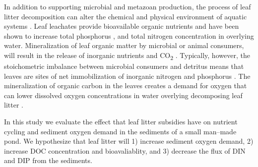In addition to supporting microbial and metazoan production, the process of leaf litter decomposition can alter the chemical and physical environment of aquatic systems \cite{Gessner_1999}. Leaf leachates provide bioavailable organic nutrients \cite{McConnell_1968,Duan_2014} and have been shown to increase total phosphorus \cite{Feh_2015b}, and total nitrogen \cite{Feh_2015} concentration in overlying water. Mineralization of leaf organic matter by microbial or animal consumers, will result in the release of inorganic nutrients and CO\textsubscript{2} \cite{CITE}. Typically, however, the stoichometric imbalance between microbial consumers and detritus means that leaves are sites of net immobilization of inorganic nitrogen and phosphorus \cite{CITE}. The mineralization of organic carbon in the leaves creates a demand for oxygen \cite{CITE} that can lower dissolved oxygen concentrations in water overlying decomposing leaf litter \cite{Hodkinson_1975,Rubbo_2008,Mehring_2014,Feh_2015b}.

In this study we evaluate the effect that leaf litter subsidies have on nutrient cycling and sediment oxygen demand in the sediments of a small man--made pond. We hypothesize that leaf litter will 1) increase sediment oxygen demand, 2) increase DOC concentration and bioavaliablity, and 3) decrease the flux of DIN and DIP from the sediments.